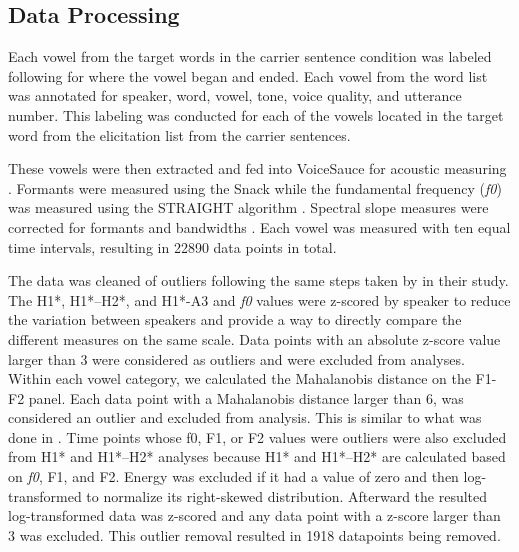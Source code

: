 \documentclass[12pt, letterpaper]{article}
\begin{document}
\subsection{Data Processing} \label{sec:Processing}

Each vowel from the target words in the carrier sentence condition was labeled following \citet{garellekAcousticDiscriminabilityComplex2020} for where the vowel began and ended. Each vowel from the word list was annotated for speaker, word, vowel, tone, voice quality, and utterance number. This labeling was conducted for each of the vowels located in the target word from the elicitation list from the carrier sentences.

These vowels were then extracted and fed into VoiceSauce for acoustic measuring \citep{shueVOICESAUCEProgramVoice2009}. Formants were measured using the Snack \citep{sjolanderSnackSoundToolkit2004} while the fundamental frequency (\textit{f0}) was measured using the STRAIGHT algorithm \citep{kawaharaInstantaneousfrequencybasedPitchExtraction1998}. Spectral slope measures were corrected for formants and bandwidths \citep{hansonGlottalCharacteristicsFemale1997,iseliAgeSexVowel2007}. Each vowel was measured with ten equal time intervals, resulting in 22890 data points in total.

The data was cleaned of outliers following the same steps taken by \citet{chaiH1H2Acoustic2022} in their study. The H1*, H1*–H2*, and H1*-A3 and \textit{f0} values were z-scored by speaker to reduce the variation between speakers and provide a way to directly compare the different measures on the same scale. Data points with an absolute z-score value larger than 3 were considered as outliers and were excluded from analyses. Within each vowel category, we calculated the Mahalanobis distance on the F1-F2 panel. Each data point with a Mahalanobis distance larger than 6, was considered an outlier and excluded from analysis. This is similar to what was done in \citet{garellekPhoneticsWhiteHmong2021,seyfarthPlosiveVoicingAcoustics2018,chaiCheckedSyllablesChecked2022}. Time points whose f0, F1, or F2 values were outliers were also excluded from H1* and H1*–H2* analyses because H1* and H1*–H2* are calculated based on \textit{f0}, F1, and F2. Energy was excluded if it had a value of zero and then log-transformed to normalize its right-skewed distribution. Afterward the resulted log-transformed data was z-scored and any data point with a z-score larger than 3 was excluded. This outlier removal resulted in 1918 datapoints being removed. 
\end{document}
